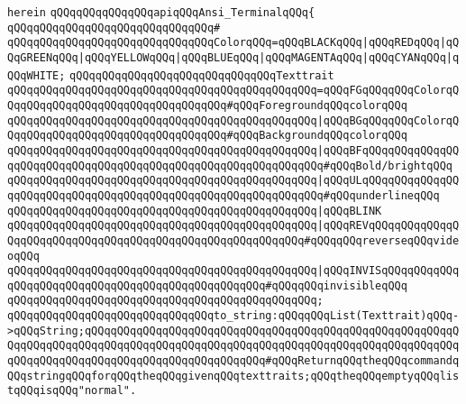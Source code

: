 \verb|herein|\newline
\newline
\verb|qQQqqQQqqQQqqQQqapiqQQqAnsi_TerminalqQQq{|\newline
\verb|qQQqqQQqqQQqqQQqqQQqqQQqqQQqqQQq#|\newline
\verb|qQQqqQQqqQQqqQQqqQQqqQQqqQQqqQQqColorqQQq=qQQqBLACKqQQq|\verb#|qQQqREDqQQq|qQQqGREENqQQq|qQQqYELLOWqQQq|qQQqBLUEqQQq|qQQqMAGENTAqQQq|qQQqCYANqQQq|qQQqWHITE;#\newline
\newline
\verb|qQQqqQQqqQQqqQQqqQQqqQQqqQQqqQQqTexttrait|\newline
\verb|qQQqqQQqqQQqqQQqqQQqqQQqqQQqqQQqqQQqqQQqqQQqqQQq=qQQqFGqQQqqQQqColorqQQqqQQqqQQqqQQqqQQqqQQqqQQqqQQqqQQq#qQQqForegroundqQQqcolorqQQq|\newline
\verb|qQQqqQQqqQQqqQQqqQQqqQQqqQQqqQQqqQQqqQQqqQQqqQQq|\verb#|qQQqBGqQQqqQQqColorqQQqqQQqqQQqqQQqqQQqqQQqqQQqqQQqqQQq#\verb|#qQQqBackgroundqQQqcolorqQQq|\newline
\verb|qQQqqQQqqQQqqQQqqQQqqQQqqQQqqQQqqQQqqQQqqQQqqQQq|\verb#|qQQqBFqQQqqQQqqQQqqQQqqQQqqQQqqQQqqQQqqQQqqQQqqQQqqQQqqQQqqQQqqQQqqQQq#\verb|#qQQqBold/brightqQQq|\newline
\verb|qQQqqQQqqQQqqQQqqQQqqQQqqQQqqQQqqQQqqQQqqQQqqQQq|\verb#|qQQqULqQQqqQQqqQQqqQQqqQQqqQQqqQQqqQQqqQQqqQQqqQQqqQQqqQQqqQQqqQQqqQQq#\verb|#qQQqunderlineqQQq|\newline
\verb|qQQqqQQqqQQqqQQqqQQqqQQqqQQqqQQqqQQqqQQqqQQqqQQq|\verb#|qQQqBLINK#\newline
\verb|qQQqqQQqqQQqqQQqqQQqqQQqqQQqqQQqqQQqqQQqqQQqqQQq|\verb#|qQQqREVqQQqqQQqqQQqqQQqqQQqqQQqqQQqqQQqqQQqqQQqqQQqqQQqqQQqqQQqqQQq#\verb|#qQQqqQQqreverseqQQqvideoqQQq|\newline
\verb|qQQqqQQqqQQqqQQqqQQqqQQqqQQqqQQqqQQqqQQqqQQqqQQq|\verb#|qQQqINVISqQQqqQQqqQQqqQQqqQQqqQQqqQQqqQQqqQQqqQQqqQQqqQQqqQQq#\verb|#qQQqqQQqinvisibleqQQq|\newline
\verb|qQQqqQQqqQQqqQQqqQQqqQQqqQQqqQQqqQQqqQQqqQQqqQQq;|\newline
\newline
\verb|qQQqqQQqqQQqqQQqqQQqqQQqqQQqqQQqto_string:qQQqqQQqList(Texttrait)qQQq->qQQqString;qQQqqQQqqQQqqQQqqQQqqQQqqQQqqQQqqQQqqQQqqQQqqQQqqQQqqQQqqQQqqQQqqQQqqQQqqQQqqQQqqQQqqQQqqQQqqQQqqQQqqQQqqQQqqQQqqQQqqQQqqQQqqQQqqQQqqQQqqQQqqQQqqQQqqQQqqQQqqQQqqQQqqQQq#qQQqReturnqQQqtheqQQqcommandqQQqstringqQQqforqQQqtheqQQqgivenqQQqtexttraits;qQQqtheqQQqemptyqQQqlistqQQqisqQQq"normal".|\newline
\newline
